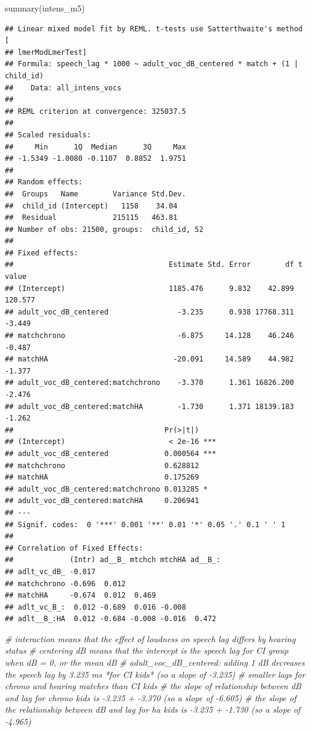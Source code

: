 \documentclass[
]{article}
\newenvironment{Shaded}{\begin{snugshade}}{\end{snugshade}}
\newcommand{\CommentTok}[1]{\textcolor[rgb]{0.56,0.35,0.01}{\textit{#1}}}
\newcommand{\FunctionTok}[1]{\textcolor[rgb]{0.00,0.00,0.00}{#1}}
\newcommand{\NormalTok}[1]{#1}
\begin{document}
\begin{Shaded}
\begin{Highlighting}[]
\FunctionTok{summary}\NormalTok{(intens\_m5)}
\end{Highlighting}
\end{Shaded}

\begin{verbatim}
## Linear mixed model fit by REML. t-tests use Satterthwaite's method [
## lmerModLmerTest]
## Formula: speech_lag * 1000 ~ adult_voc_dB_centered * match + (1 | child_id)
##    Data: all_intens_vocs
## 
## REML criterion at convergence: 325037.5
## 
## Scaled residuals: 
##     Min      1Q  Median      3Q     Max 
## -1.5349 -1.0080 -0.1107  0.8852  1.9751 
## 
## Random effects:
##  Groups   Name        Variance Std.Dev.
##  child_id (Intercept)   1158    34.04  
##  Residual             215115   463.81  
## Number of obs: 21500, groups:  child_id, 52
## 
## Fixed effects:
##                                    Estimate Std. Error        df t value
## (Intercept)                        1185.476      9.832    42.899 120.577
## adult_voc_dB_centered                -3.235      0.938 17768.311  -3.449
## matchchrono                          -6.875     14.128    46.246  -0.487
## matchHA                             -20.091     14.589    44.982  -1.377
## adult_voc_dB_centered:matchchrono    -3.370      1.361 16826.200  -2.476
## adult_voc_dB_centered:matchHA        -1.730      1.371 18139.183  -1.262
##                                   Pr(>|t|)    
## (Intercept)                        < 2e-16 ***
## adult_voc_dB_centered             0.000564 ***
## matchchrono                       0.628812    
## matchHA                           0.175269    
## adult_voc_dB_centered:matchchrono 0.013285 *  
## adult_voc_dB_centered:matchHA     0.206941    
## ---
## Signif. codes:  0 '***' 0.001 '**' 0.01 '*' 0.05 '.' 0.1 ' ' 1
## 
## Correlation of Fixed Effects:
##             (Intr) ad__B_ mtchch mtchHA ad__B_:
## adlt_vc_dB_ -0.017                             
## matchchrono -0.696  0.012                      
## matchHA     -0.674  0.012  0.469               
## adlt_vc_B_:  0.012 -0.689  0.016 -0.008        
## adlt__B_:HA  0.012 -0.684 -0.008 -0.016  0.472
\end{verbatim}

\begin{Shaded}
\begin{Highlighting}[]
\CommentTok{\# interaction means that the effect of loudness on speech lag differs by hearing status}
\CommentTok{\# centering dB means that the intercept is the speech lag for CI group when dB = 0, or the mean dB}
\CommentTok{\# adult\_voc\_dB\_centered: adding 1 dB decreases the speech lag by 3.235 ms *for CI kids* (so a slope of {-}3.235)}
\CommentTok{\# smaller lags for chrono and hearing matches than CI kids }
\CommentTok{\# the slope of relationship between dB and lag for chrono kids is {-}3.235 + {-}3.370 (so a slope of {-}6.605)}
\CommentTok{\# the slope of the relationship between dB and lag for ha kids is {-}3.235 + {-}1.730 (so a slope of {-}4.965)}
\end{Highlighting}
\end{Shaded}
\end{document}
